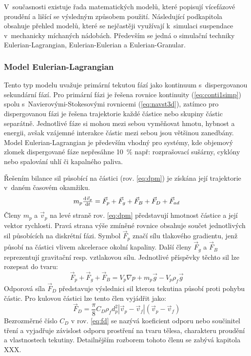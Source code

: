 V~současnosti existuje řada matematických modelů, které popisují vícefázové proudění a lišící se výsledným způsobem použití. Následující podkapitola obsahuje přehled modelů, které se nejčastěji využívají k~simulaci suspendace v~mechanicky míchaných nádobách. Především se jedná o simulační techniky Eulerian-Lagrangian, Eulerian-Eulerian a Eulerian-Granular.

\subsubsection{Model Eulerian-Lagrangian}
Tento typ modelu uvažuje primární tekutou fází jako kontinuum s~dispergovanou sekundární fází. Pro primární fázi je řešena rovnice kontinuity (\ref{eq:conti1simp}) spolu s~Navierovými-Stokesovými rovnicemi (\ref{eq:navst3d}), zatímco pro dispergovanou fázi je řešena trajektorie každé částice nebo skupiny částic separátně. Jednotlivé fáze si mohou mezi sebou vyměňovat hmotu, hybnost a energii, avšak vzájemné interakce částic mezi sebou jsou většinou zanedbány. Model Eulerian-Lagrangian je především vhodný pro systémy, kde objemový zlomek dispergované fáze nepřesáhne \SI{10}{\percent} např: rozprašovací sušárny, cyklóny nebo spalování uhlí či kapalného paliva. 

Řešením bilance sil působící na částici (rov. \ref{eq:dpm}) je získána její trajektorie v~daném časovém okamžiku.
\begin{equation}
	m_{p}\od{\vec{v}_{p}}{t} = \vec{F}_{p} + \vec{F}_{g} + \vec{F}_{B} + \vec{F}_{D} + \vec{F}_{ad}
	\label{eq:dpm}
\end{equation} 
Členy $m_{p}$ a $\vec{v}_{p}$ na levé straně rov. \ref{eq:dpm} představují hmotnost částice a její vektor rychlosti. Pravá strana výše zmíněné rovnice obsahuje součet jednotlivých sil působících na diskrétní fázi. Symbol $\vec{F}_{p}$ značí sílu tlakového gradientu, jenž působí na částici vlivem akcelerace okolní kapaliny. Další členy $\vec{F}_{g}$ a $\vec{F}_{B}$ reprezentují gravitační resp. vztlakovou sílu. Jednotlivé příspěvky těchto sil lze rozepsat do tvaru:    
\begin{equation}
	\vec{F}_{p} + \vec{F}_{g} + \vec{F}_{B} = V_{p} \nabla p + m_{p} \vec{g} -  V_{p} \rho_{f} \vec{g}
	\label{eq:force3}
\end{equation} 
 Odporová síla $\vec{F}_{D}$ představuje výslednici sil kterou tekutina působí proti pohybu částic. Pro kulovou částici lze tento člen vyjádřit jako:
\begin{equation}
	\vec{F}_{D} = \frac{\pi}{8}C_{D}\rho_{f} d_{p}^{2} \left|\vec{v}_{p} - \vec{v}_{f}\right| \left(\vec{v}_{p} - \vec{v}_{f}\right)
	\label{eq:fd}
\end{equation} 
Bezrozměrné číslo $C_{D}$ v rov. \ref{eq:fd} se nazývá koeficient odporu nebo součinitel tření a vyjadřuje závislost odporu prostření na tvaru tělesa, charakteru proudění a vlastnostech tekutiny. Detailnějším rozborem tohoto členu se zabývá kapitola XXX.

